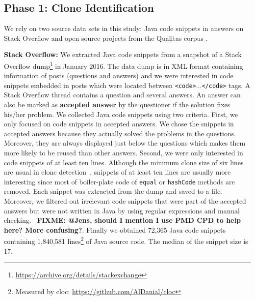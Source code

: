 \documentclass[10pt,journal,compsoc]{IEEEtran}
\newcommand\FIXME[1]{{\color{red}\textbf{FIXME: #1}}}
\begin{document}
\subsection{Phase 1: Clone Identification}

We rely on two source data sets in this study: Java code snippets in answers
on Stack Overflow and open source projects from the Qualitas corpus
\cite{QualitasCorpus}.

\textbf{Stack Overflow:} 
We extracted Java code snippets from a snapshot of a Stack Overflow
dump\footnote{\url{https://archive.org/details/stackexchange}} in January 2016.
The data dump is in XML format containing information of posts (questions and
answers) and we were interested in code snippets embedded in posts which were
located between {\small\texttt{<code>}...\texttt{</code>}} tags. A Stack
Overflow thread contains a question and several answers. An answer can also be
marked as \textbf{accepted answer} by the questioner if the solution fixes
his/her problem. We collected Java code snippets using two criteria. First, we
only focused on code snippets in accepted answers. We chose the snippets in
accepted answers because they actually solved the problems in the questions.
Moreover, they are always displayed just below the questions which makes them
more likely to be reused than other answers. Second, we were only interested in
code snippets of at least ten lines. Although the minimum clone size of six
lines are usual in clone detection~\cite{Bellon2007,Wang2013,Koschke2006},
snippets of at least ten lines are usually more interesting since most of
boiler-plate code of \texttt{equal} or \texttt{hashCode} methods are removed.
Each snippet was extracted from the dump and saved to a file. Moreover, we
filtered out irrelevant code snippets that were part of the accepted answers
but were not written in Java by using regular expressions and manual checking.
~\FIXME{@Jens, should I mention I use PMD CPD to help here? More confusing?}.
Finally we obtained
72,365 Java code snippets containing 1,840,581 lines\footnote{Measured by cloc:
	\url{https://github.com/AlDanial/cloc}} of Java source code. The median of the
snippet size is 17.
\end{document}
